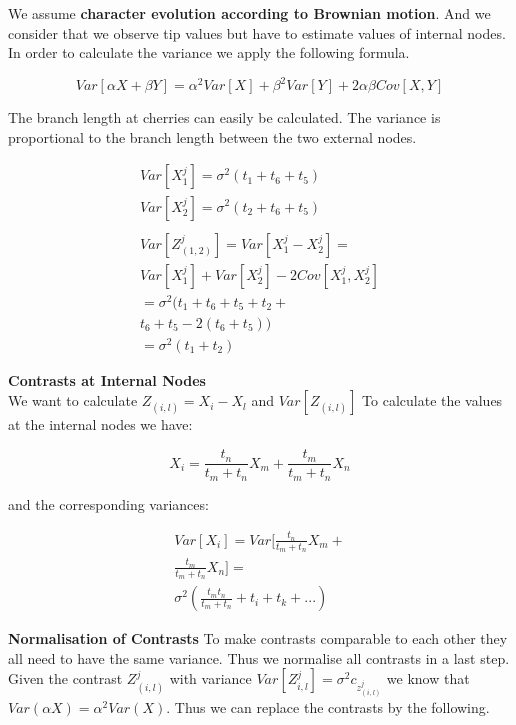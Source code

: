\documentclass{article}
\begin{document}
\begin{multicols*}{3}
We assume \textbf{character evolution according to Brownian motion}. And we consider that we observe tip values but have to estimate values of internal nodes.\\

In order to calculate the variance we apply the following formula.

$$Var[\alpha X + \beta Y] = \alpha ^2 Var[X] + \beta ^2 Var[Y] + 2\alpha \beta Cov[X,Y]$$

The branch length at cherries can easily be calculated. The variance is proportional to the branch length between the two external nodes. 

\begin{align*}
    Var[X_1^j] = \sigma ^2 (t_1+t_6+t_5)\\
    Var[X_2^j] = \sigma ^2 (t_2+t_6+t_5)\\\\
    Var[Z^j_{(1,2)}] = Var[X_1^j-X^j_2] = \\
    Var[X_1^j] + Var[X_2^j] - 2 Cov[X_1^j,X_2^j]\\
    = \sigma^2 (t_1+t_6+t_5+t_2+\\t_6+t_5-2(t_6+t_5))\\
    = \sigma ^2 (t_1 + t_2)
\end{align*}

\textbf{Contrasts at Internal Nodes}\\

We want to calculate $Z_{(i,l)} = X_i - X_l$ and $Var[Z_{(i,l)}]$
To calculate the values at the internal nodes we have: 

$$X_i = \frac{t_n}{t_m+t_n}X_m + \frac{t_m}{t_m+t_n}X_n$$

and the corresponding variances: 

\begin{align*}
Var[X_i] = Var[\frac{t_n}{t_m+t_n}X_m +\\ \frac{t_m}{t_m+t_n}X_n] =\\
\sigma ^2 \left(\frac{t_mt_n}{t_m+t_n}+ t_i + t_k + ...\right)
\end{align*}

\textbf{Normalisation of Contrasts}
To make contrasts comparable to each other they all need to have the same variance. Thus we normalise all contrasts in a last step.\\

Given the contrast $Z^j_{(i,l)}$ with variance $Var[Z^j_{i,l}] = \sigma^2c_{z^j_{(i,l)}}$ we know that $Var(\alpha X) = \alpha ^2 Var(X)$. Thus we can replace the contrasts by the following. 


\end{multicols*}
\end{document}
